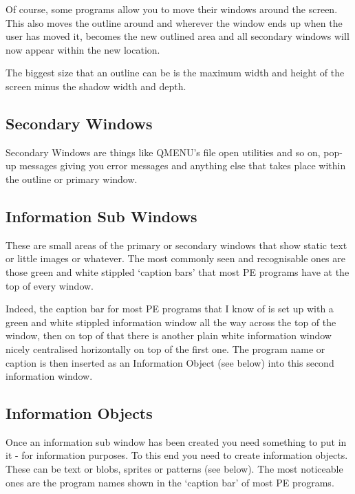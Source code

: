 Of course, some programs allow you to move their windows around
      the screen. This also moves the outline around and wherever the window
      ends up when the user has moved it, becomes the new outlined area and
      all secondary windows will now appear within the new location.

The biggest size that an outline can be is the maximum width and
      height of the screen minus the shadow width and depth.

\subsection{Secondary Windows}
\label{ch22-sec-win}%

Secondary Windows are things like QMENU's file open utilities
      and so on, pop-{}up messages giving you error messages and anything else
      that takes place within the outline or primary window.

\subsection{Information Sub Windows}
\label{ch22-sub-win}%

These are small areas of the primary or secondary windows that
      show static text or little images or whatever. The most commonly seen
      and recognisable ones are those green and white stippled `caption bars'
      that most PE programs have at the top of every window.

Indeed, the caption bar for most PE programs that I know of is set
      up with a green and white stippled information window all the way across
      the top of the window, then on top of that there is another plain white
      information window nicely centralised horizontally on top of the first
      one. The program name or caption is then inserted as an Information
      Object (see below) into this second information window.

\subsection{Information Objects}
\label{ch22-info-obj}%

Once an information sub window has been created you need something
      to put in it -{} for information purposes. To this end you need to create
      information objects. These can be text or blobs, sprites or patterns
      (see below). The most noticeable ones are the program names shown in the
      `caption bar' of most PE programs.

